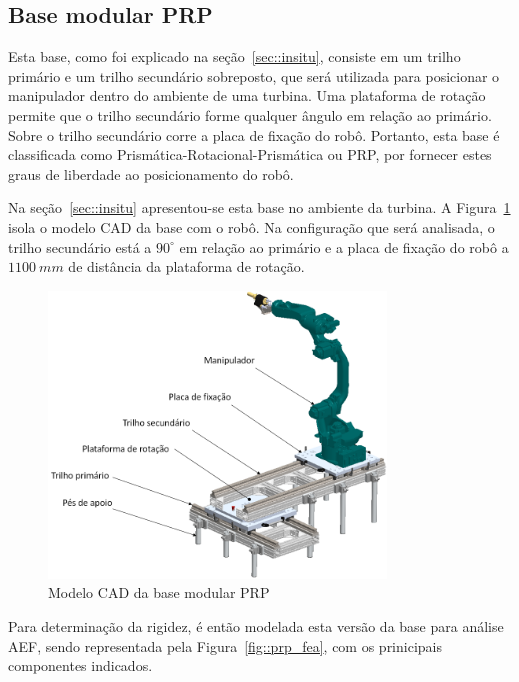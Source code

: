 \subsection{Base modular PRP}

Esta base, como foi explicado na seção~\ref{sec::insitu}, consiste em um trilho
primário e um trilho secundário sobreposto, que será utilizada para posicionar o
manipulador dentro do ambiente de uma turbina.
Uma plataforma de rotação permite que o trilho secundário forme qualquer ângulo
em relação ao primário. Sobre o trilho secundário corre a placa de fixação do
robô.
Portanto, esta base é classificada como Prismática-Rotacional-Prismática ou PRP,
por fornecer estes graus de liberdade ao posicionamento do robô. 

Na seção~\ref{sec::insitu} apresentou-se esta base no ambiente da turbina.
A Figura~\ref{fig::prp_cad} isola o modelo CAD da base com o robô. Na
configuração que será analisada, o trilho secundário está a $90^\circ$ em
relação ao primário e a placa de fixação do robô a $1100~mm$ de distância da
plataforma de rotação.

\begin{figure}[h]
	\centering 
 	\includegraphics[width=0.80\textwidth]{figs/prp_cad}
 	\caption{Modelo CAD da base modular PRP}
 	\label{fig::prp_cad}
\end{figure}

Para determinação da rigidez, é então modelada esta versão da base para análise
AEF, sendo representada pela Figura~\ref{fig::prp_fea}, com os prinicipais
componentes indicados.

